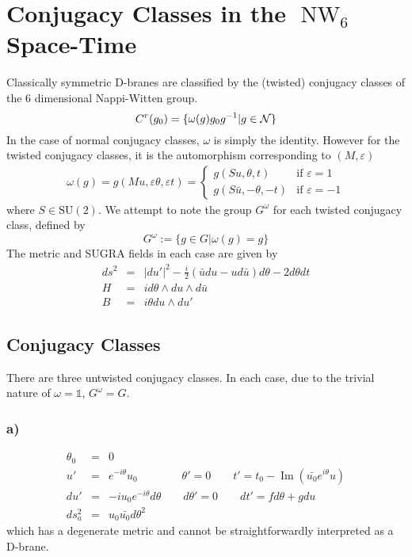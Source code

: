 \documentclass[11pt, a4paper]{article}
\DeclareMathOperator{\NW}{NW}
\DeclareMathOperator{\im}{Im}
\newcommand{\SU}{\mathrm{SU}}
\newcommand{\1}{\mathbb{1}}
\begin{document}
\section{Conjugacy Classes in the $\NW_6$ Space-Time}
Classically symmetric D-branes are classified by the (twisted) conjugacy classes
of the 6 dimensional Nappi-Witten group.
\begin{equation}
  \label{eq:twistedconjugacy}
  C^r(g_0)=\{\omega(g)g_0g^{-1}|g\in {\cal N}\}
\end{equation}
In the case of normal conjugacy classes, $\omega$ is simply the identity.
However for the twisted conjugacy classes, it is the automorphism corresponding
to $(M,\varepsilon)$
\begin{eqnarray}
  \label{eq:automorphism}
  \omega(g)=g(Mu,\varepsilon\theta, \varepsilon t)=
  \begin{cases}
    g(Su, \theta, t) & \text{if $\varepsilon=1$}\\
    g(S\bar u, -\theta, -t) & \text{if $\varepsilon=-1$}
  \end{cases}
\end{eqnarray}
where $S\in\SU(2)$. We attempt to note the group $G^\omega$ for each twisted
conjugacy class, defined by
\begin{equation}
  \label{eq:Gomega}
  G^\omega:=\{g\in G|\omega(g)=g\}
\end{equation}
The metric and SUGRA fields in each case are given by
\begin{eqnarray}
  \label{eq:G}
  ds^2&=&|du'|^2-\frac i2 (\bar udu-ud\bar u)d\theta-2d\theta dt\\
  \label{eq:H}
  H&=&id\theta\wedge du\wedge d\bar u\\
  \label{eq:B}
  B&=&i\theta du\wedge du'
\end{eqnarray}

\subsection{Conjugacy Classes}
There are three untwisted conjugacy classes. In each case, due to the trivial
nature of $\omega=\1$, $G^\omega=G$.
\subsubsection{a)}
\begin{eqnarray}
  \label{eq:a}
  \theta_0&=&0\\\nonumber
  u'&=&e^{-i\theta}u_0\qquad\qquad\theta'=0\qquad t'=t_0-\im(\bar{u_0}e^{i\theta}u)\\\nonumber
  du'&=&-iu_0e^{-i\theta}d\theta\qquad d\theta'=0\qquad dt'=fd\theta+gdu\\\nonumber
  ds^2_a&=&u_0\bar{u_0}d\theta^2
\end{eqnarray}
which has a degenerate metric and cannot be straightforwardly interpreted as a
D-brane.
\end{document}
